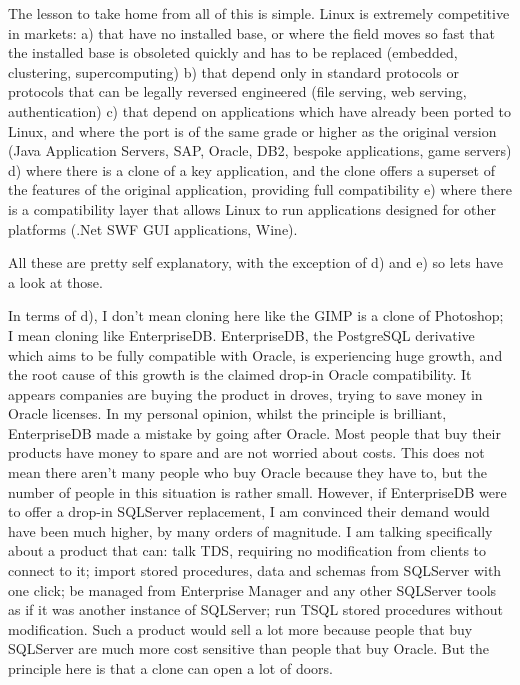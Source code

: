 \documentclass{book}
\begin{document}
The lesson to take home from all of this is simple. Linux is extremely
competitive in markets: a) that have no installed base, or where the
field moves so fast that the installed base is obsoleted quickly and
has to be replaced (embedded, clustering, supercomputing) b) that
depend only in standard protocols or protocols that can be legally
reversed engineered (file serving, web serving, authentication) c)
that depend on applications which have already been ported to Linux,
and where the port is of the same grade or higher as the original
version (Java Application Servers, SAP, Oracle, DB2, bespoke
applications, game servers) d) where there is a clone of a key
application, and the clone offers a superset of the features of the
original application, providing full compatibility e) where there is a
compatibility layer that allows Linux to run applications designed for
other platforms (.Net SWF GUI applications, Wine).

All these are pretty self explanatory, with the exception of d) and e)
so lets have a look at those.

In terms of d), I don't mean cloning here like the GIMP is a clone of
Photoshop; I mean cloning like EnterpriseDB. EnterpriseDB, the
PostgreSQL derivative which aims to be fully compatible with Oracle,
is experiencing huge growth, and the root cause of this growth is the
claimed drop-in Oracle compatibility. It appears companies are buying
the product in droves, trying to save money in Oracle licenses. In my
personal opinion, whilst the principle is brilliant, EnterpriseDB made
a mistake by going after Oracle. Most people that buy their products
have money to spare and are not worried about costs. This does not
mean there aren't many people who buy Oracle because they have to, but
the number of people in this situation is rather small. However, if
EnterpriseDB were to offer a drop-in SQLServer replacement, I am
convinced their demand would have been much higher, by many orders of
magnitude. I am talking specifically about a product that can: talk
TDS, requiring no modification from clients to connect to it; import
stored procedures, data and schemas from SQLServer with one click; be
managed from Enterprise Manager and any other SQLServer tools as if it
was another instance of SQLServer; run TSQL stored procedures without
modification. Such a product would sell a lot more because people that
buy SQLServer are much more cost sensitive than people that buy
Oracle. But the principle here is that a clone can open a lot of
doors.
\end{document}
